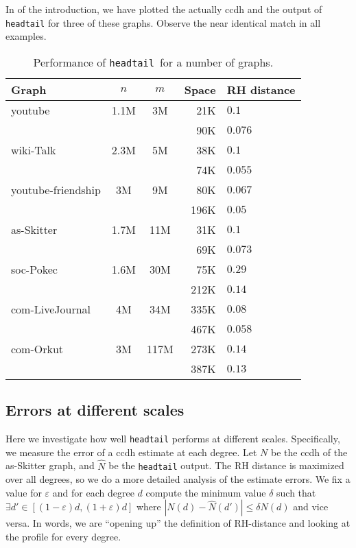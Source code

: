 \documentclass[11pt]{article}
\theoremstyle{definition}
\def\eps{\varepsilon}
\newcommand{\hN}{\widehat{N}}
\newcommand{\degdist}{{\tt headtail}}
\begin{document}
In  of the introduction, we have plotted the actually ccdh and the output
of \degdist{} for three of these graphs.
Observe the near identical match in all examples.

\begin{table}
\small
\centering
\begin{tabular}{l|c|c|r|l}
\hline
Graph & $n$ & $m$ & Space & RH distance\\
\hline\hline
youtube & 1.1M & 3M & 21K & $0.1$\\
& & & 90K & $0.076$\\\hline
wiki-Talk & 2.3M & 5M & 38K & $0.1$\\
& & & 74K & $0.055$\\\hline
youtube-friendship & 3M & 9M & 80K & $0.067$\\
& & & 196K & $0.05$\\\hline
as-Skitter & 1.7M & 11M & 31K & $0.1$\\
& & & 69K & $0.073$\\\hline
soc-Pokec & 1.6M & 30M& 75K & $0.29$\\
& & & 212K & $0.14$\\\hline
com-LiveJournal & 4M & 34M& 335K & $0.08$\\
& & & 467K & $0.058$\\\hline
com-Orkut & 3M & 117M& 273K & $0.14$\\
& & & 387K & $0.13$\\\hline
\end{tabular}
\caption{Performance of \degdist~for a number of graphs.}
\label{table:manygraphs}
\end{table}

\subsection{Errors at different scales}\label{sec:differentscales}
Here we investigate how well \degdist{} performs at different scales.
Specifically, we measure the error of a ccdh estimate at each degree.  Let $N$
be the ccdh of the as-Skitter graph, and $\hN$ be the \degdist{} output.
The RH distance is maximized over all degrees, so we do a more detailed
analysis of the estimate errors.
We fix a value for $\eps$ and for each
degree $d$ compute the minimum value $\delta$ such that $\exists d' \in
[(1-\eps)d, (1+\eps)d]$ where $|N(d) - \hN(d')| \leq \delta N(d)$ and vice versa.
In words, we are ``opening up'' the definition of RH-distance and looking at the
profile for every degree.
\end{document}
